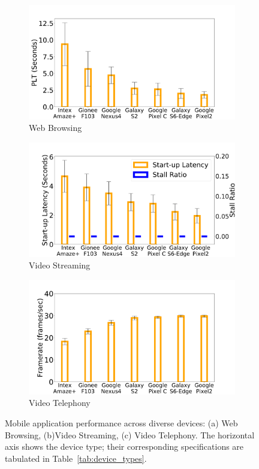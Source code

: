 \begin{figure}
    \begin{subfigure}[b]{0.33\textwidth}
        \centering
        \includegraphics[width=1\linewidth]{sections/device-work/plt-devices}
        \caption{Web Browsing}
    \end{subfigure}
    \begin{subfigure}[b]{0.33\textwidth}
        \centering
        \includegraphics[width=1\linewidth]{sections/device-work/youtube-motivation}
        \caption{Video Streaming}
    \end{subfigure}%
    \begin{subfigure}[b]{0.33\textwidth}
        \centering
        \includegraphics[width=1\linewidth]{sections/device-work/skype-motivation}
        \caption{Video Telephony}
    \end{subfigure}
     \caption{Mobile application performance across diverse devices: (a) Web Browsing, (b)Video Streaming, (c) Video Telephony. The horizontal axis shows the device type; their corresponding specifications are tabulated in Table~\ref{tab:device_types}.}
     \label{fig:motivation}
\end{figure}
